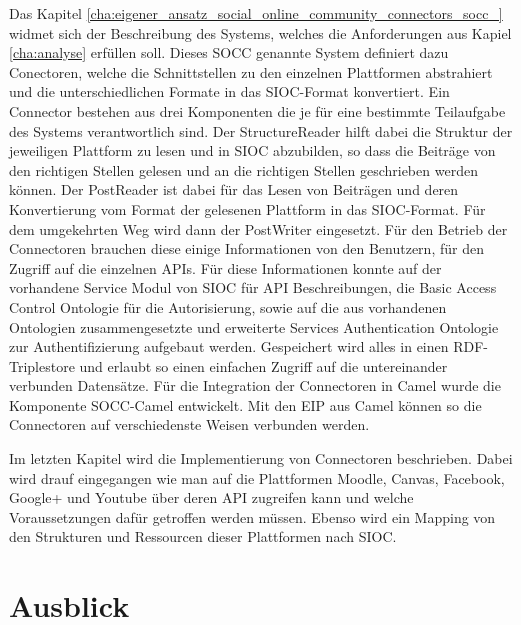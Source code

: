 Das Kapitel \ref{cha:eigener_ansatz_social_online_community_connectors_socc_} widmet sich der Beschreibung des Systems, welches die Anforderungen aus Kapiel \ref{cha:analyse} erfüllen soll. Dieses SOCC genannte System definiert dazu Conectoren, welche die Schnittstellen zu den einzelnen Plattformen abstrahiert und die unterschiedlichen Formate in das SIOC-Format konvertiert. Ein Connector bestehen aus drei Komponenten die je für eine bestimmte Teilaufgabe des Systems verantwortlich sind. Der StructureReader hilft dabei die Struktur der jeweiligen Plattform zu lesen und  in SIOC abzubilden, so dass die Beiträge von den richtigen Stellen gelesen und an die richtigen Stellen geschrieben werden können. Der PostReader ist dabei für das Lesen von Beiträgen und deren Konvertierung vom Format der gelesenen Plattform in das SIOC-Format. Für dem umgekehrten Weg wird dann der PostWriter eingesetzt. Für den Betrieb der Connectoren brauchen diese einige Informationen von den Benutzern, für den Zugriff auf die einzelnen APIs. Für diese Informationen konnte auf der vorhandene Service Modul von SIOC für API Beschreibungen, die Basic Access Control Ontologie für die Autorisierung, sowie auf die aus vorhandenen Ontologien zusammengesetzte und erweiterte Services Authentication Ontologie zur Authentifizierung aufgebaut werden. Gespeichert wird alles in einen RDF-Triplestore und erlaubt so einen einfachen Zugriff auf die untereinander verbunden Datensätze. Für die Integration der Connectoren in Camel wurde die Komponente SOCC-Camel entwickelt. Mit den EIP aus Camel können so die Connectoren auf verschiedenste Weisen verbunden werden.

Im letzten Kapitel wird die Implementierung von Connectoren beschrieben. Dabei wird drauf eingegangen wie man auf die Plattformen Moodle, Canvas, Facebook, Google+ und Youtube über deren API zugreifen kann und welche Voraussetzungen dafür getroffen werden müssen. Ebenso wird ein Mapping von den Strukturen und Ressourcen dieser Plattformen nach SIOC. 



\section{Ausblick} %
\label{sec:ausblick}



